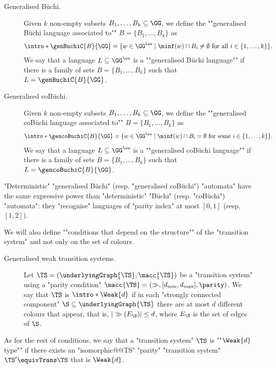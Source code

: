 \documentclass{theoretics}
\begin{document}
\begin{description}	
	\item[Generalised B\"uchi.] \AP Given $k$ non-empty subsets $B_1,\dots, B_k\subseteq \GG$, we define the ""generalised Büchi language associated to"" $B=\{B_1,\dots,B_k\}$ as
	\[ \intro*\genBuchiC{B}{\GG}  = \{w\in \GG^\oo \mid \minf(w) \cap B_i \neq \emptyset \text{ for all } i\in\{1,\dots, k\}\}. \]
	\AP We say that a language $L\subseteq \GG^\oo$ is a ""generalised B\"uchi language"" if there is a family of sets $B=\{B_1,\dots,B_k\}$ such that $L = \genBuchiC{B}{\GG}$.
	\item[Generalised coB\"uchi.] \AP Given $k$ non-empty subsets $B_1,\dots, B_k\subseteq \GG$, we define the ""generalised coB\"uchi language associated to"" $B=\{B_1,\dots,B_k\}$ as
	\[ \intro*\gencoBuchiC{B}{\GG}  = \{w\in \GG^\oo \mid \minf(w) \cap B_i = \emptyset \text{ for some } i\in\{1,\dots, k\}\}. \]
	\AP We say that a language $L\subseteq \GG^\oo$ is a ""generalised coB\"uchi language"" if there is a family of sets $B=\{B_1,\dots,B_k\}$ such that $L = \gencoBuchiC{B}{\GG}$.
\end{description}

\begin{remark}\label{rmk-app:genBuchi-expressive-power}
	"Deterministic" "generalised B\"uchi" (resp. "generalised coB\"uchi") "automata" have the same expressive power than "deterministic" "B\"uchi" (resp. "coB\"uchi") "automata": they "recognise" languages of "parity index" at most $[0,1]$ (resp. $[1,2]$).
\end{remark}

\AP We will also define ""conditions that depend on the structure"" of the "transition system" and not only on the set of colours.
\begin{description}	
	\item[Generalised weak transition systems.]\AP Let $\TS =(\underlyingGraph{\TS}, \macc{\TS})$ be a "transition system" using a "parity condition" $\macc{\TS}=(\gg, [d_{\min},d_{\max}], \parity)$. We say that $\TS$ is $\intro*\Weak{d}$ if in each "strongly connected component" $\S \subseteq \underlyingGraph{\TS}$ there are at most $d$ different colours that appear, that is, $|\gg(E_\S)| \leq d$, where $E_\S$ is the set of edges of $\S$.	
\end{description}

\AP As for the rest of conditions, we say that a "transition system" $\TS$ is ""$\Weak{d}$ type"" if there exists an "isomorphic@@TS" "parity" "transition system" $\TS'\equivTrans \TS$ that is $\Weak{d}$.
\end{document}
